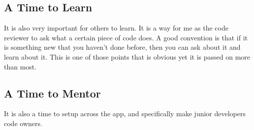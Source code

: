 \subsection{ A Time to Learn }
It is also very important for others to learn. It is a way for me as the code
reviewer to ask what a certain piece of code does. A good convention is that if
it is something new that you haven't done before, then you can ask about it
and learn about it. This is one of those points that is obvious yet it is passed
on more than most.

\subsection{ A Time to Mentor }
It is also a time to setup \codeowners{} across the app, and specifically make
junior developers code owners. 
